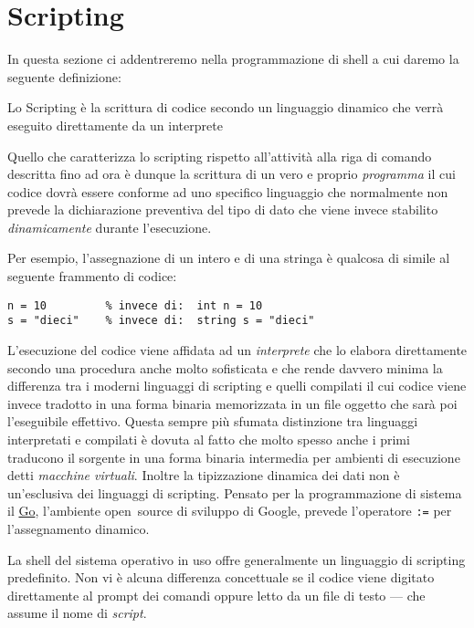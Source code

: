 
\chapter{Scripting}
\label{chapScripting}

In questa sezione ci addentreremo nella programmazione di shell a cui daremo
la seguente definizione:

\begin{tcolorbox}[title=Definizione di \emph{Scripting}]
Lo Scripting è la scrittura di codice secondo un linguaggio dinamico che verrà
eseguito direttamente da un interprete
\end{tcolorbox}

Quello che caratterizza lo scripting rispetto all'attività alla riga di
comando descritta fino ad ora è dunque la scrittura di un vero e proprio
\emph{programma} il cui codice dovrà essere conforme ad uno specifico
linguaggio che normalmente non prevede la dichiarazione preventiva del tipo di
dato che viene invece stabilito \emph{dinamicamente} durante l'esecuzione.

Per esempio, l'assegnazione di un intero e di una stringa è qualcosa di simile
al seguente frammento di codice:
\begin{Verbatim}
n = 10         % invece di:  int n = 10
s = "dieci"    % invece di:  string s = "dieci"
\end{Verbatim}

L'esecuzione del codice viene affidata ad un \emph{interprete} che lo
elabora direttamente secondo una procedura anche molto sofisticata e che rende
davvero minima la differenza tra i moderni linguaggi di scripting e quelli
compilati il cui codice viene invece tradotto in una forma binaria
memorizzata in un file oggetto che sarà poi l'eseguibile effettivo.
Questa sempre più sfumata distinzione tra linguaggi interpretati e compilati è
dovuta al fatto che molto spesso anche i primi traducono il sorgente in
una forma binaria intermedia per ambienti di esecuzione detti \emph{macchine
virtuali}. Inoltre la tipizzazione dinamica dei dati non è un'esclusiva dei
linguaggi di scripting. Pensato per la programmazione di sistema il
\href{http://golang.org/}{Go}, l'ambiente open~source di sviluppo di Google,
prevede l'operatore \texttt{:=} per l'assegnamento dinamico.

La shell del sistema operativo in uso offre generalmente un linguaggio di
scripting predefinito. Non vi è alcuna differenza concettuale se il codice
viene digitato direttamente al prompt dei comandi oppure letto da un file di
testo --- che assume il nome di \emph{script}.

